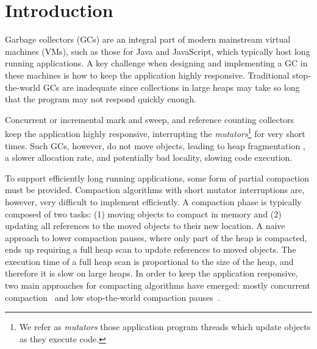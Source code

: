 \documentclass[sigplan,10pt,review,anonymous]{acmart}\settopmatter{printfolios=true,printccs=false,printacmref=false}
\newcommand{\egb}[1]{\color{blue}\fbox{\bfseries\sffamily\scriptsize Elisa:}{\sf\small$\blacktriangleright$\textit{#1}$\blacktriangleleft$}\color{black}}
\begin{document}
\section{Introduction}

Garbage collectors (GCs) are an integral part of  modern mainstream virtual machines (VMs), such as those for Java and JavaScript, which typically host long running applications.
A key challenge when designing and implementing a GC in these machines is how to keep the application highly responsive.
Traditional stop-the-world GCs are inadequate since collections in large heaps may take so long that the program may not respond quickly enough.

Concurrent or incremental mark and sweep, and reference counting collectors \cite{ConcNonMovingGC,ConcNonMovingGC2,CMSGC,ConcRefCount} keep the application highly responsive, interrupting the \emph{mutators}\footnote{We refer as \emph{mutators} those application program threads which update objects as they execute code.} for very short times. Such GCs, however, do not move objects, leading to heap fragmentation \cite{GCHandBookFrag}, a slower allocation rate, and potentially bad locality, slowing code execution. 

To support efficiently long running applications, some form of partial compaction must be provided.
Compaction algorithms with short mutator interruptions are, however, very difficult to implement efficiently. A compaction phase is typically composed of two tasks: (1) moving objects to compact in memory and (2) updating all references to the moved objects to their new location. A naive approach to lower compaction pauses, where only part of the heap is compacted, ends up requiring a full heap scan to update references to moved objects. The execution time of a full heap scan is proportional to the size of the heap, and therefore it is slow on large heaps. 
In order to keep the application responsive, two main approaches for compacting algorithms have emerged: mostly concurrent compaction~\cite{AzulVirtualMemConcCompact,IBMConcCompact,AzulHardwareReadBarrierConcCompact,Shenandoah,MetronomeIBMGC,RTConcCompactGC,RTGCBrooksReadBarrier} and low stop-the-world compaction pauses~\cite{G1,VirtualMemConcCompact}.
\end{document}
